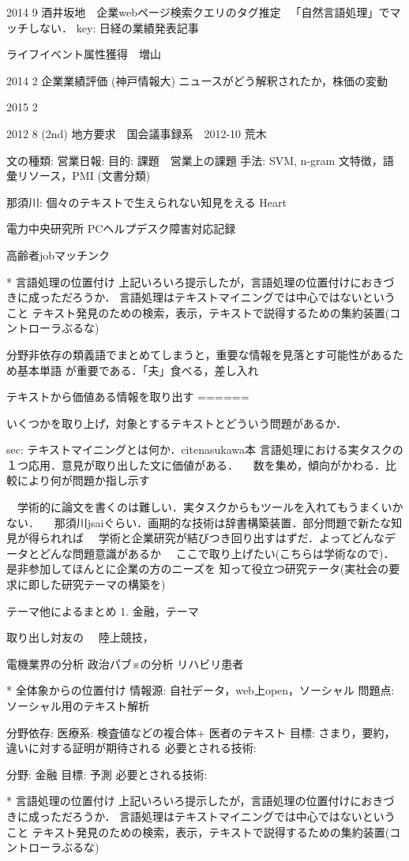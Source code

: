 \documentclass[twocolumn]{jarticle}
\begin{document}
2014 9
酒井坂地　企業webページ検索クエリのタグ推定
　「自然言語処理」でマッチしない．
key: 日経の業績発表記事

ライフイベント属性獲得　増山

2014 2
企業業績評価 (神戸情報大) 
ニュースがどう解釈されたか，株価の変動

2015 2

2012 8 (2nd)
地方要求　国会議事録系　2012-10 荒木

文の種類: 営業日報: 
目的: 課題　営業上の課題
手法: SVM, n-gram 文特徴，語彙リソース，PMI  (文書分類)

那須川: 個々のテキストで生えられない知見をえる Heart

電力中央研究所
PCヘルプデスク障害対応記録

高齢者jobマッチンク


* 言語処理の位置付け
上記いろいろ提示したが，言語処理の位置付けにおきづきに成っただろうか．
言語処理はテキストマイニングでは中心ではないということ
テキスト発見のための検索，表示，テキストで説得するための集約装置(コントローラぶるな)

分野非依存の類義語でまとめてしまうと，重要な情報を見落とす可能性があるため基本単語
が重要である．「夫」食べる，差し入れ

  テキストから価値ある情報を取り出す
  ======


いくつかを取り上げ，対象とするテキストとどういう問題があるか．

sec: テキストマイニングとは何か．cite{nasukawa本}
  言語処理における実タスクの１つ応用．意見が取り出した文に価値がある．
 　数を集め，傾向がかわる．比較により何が問題か指し示す

　学術的に論文を書くのは難しい．実タスクからもツールを入れてもうまくいかない．
　那須川jsaiぐらい．画期的な技術は辞書構築装置．部分問題で新たな知見が得られれば
　学術と企業研究が結びつき回り出すはずだ．よってどんなデータとどんな問題意識があるか
　ここで取り上げたい(こちらは学術なので)．是非参加してほんとに企業の方のニーズを
知って役立つ研究テータ(実社会の要求に即した研究テーマの構築を)

テーマ他によるまとめ
1. 金融，テーマ

取り出し対友の
　陸上競技，

電機業界の分析
政治パブ※の分析
リハビリ患者


* 全体象からの位置付け
  情報源: 自社データ，web上open，ソーシャル
問題点: ソーシャル用のテキスト解析


分野依存: 医療系: 検査値などの複合体+ 医者のテキスト
目標: さまり，要約，違いに対する証明が期待される
必要とされる技術: 

分野: 金融
目標: 予測
必要とされる技術: 


* 言語処理の位置付け
上記いろいろ提示したが，言語処理の位置付けにおきづきに成っただろうか．
言語処理はテキストマイニングでは中心ではないということ
テキスト発見のための検索，表示，テキストで説得するための集約装置(コントローラぶるな)




\end{document}

